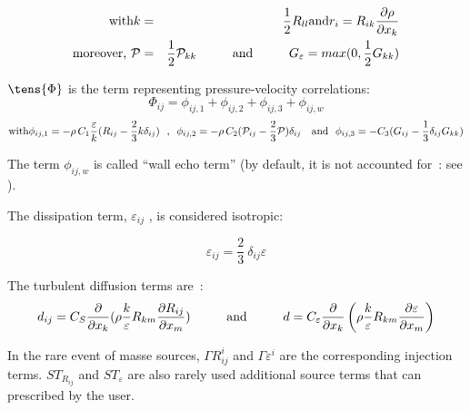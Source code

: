 \begin{eqnarray}
\text{with\hspace*{0cm}}\displaystyle k &=&\frac{1}{2}R_{ll}\text{%
\hspace*{0cm}and\hspace*{0cm}}\displaystyle r_{i}=R_{ik}\frac{\partial \rho
}{\partial x_{k}} \\
\text{moreover,  }\mathcal{P} &=&\frac{1}{2}\mathcal{P}_{kk}\text{%
\hspace*{1cm}and\hspace*{1cm}}G_{\varepsilon }=max(0,\frac{1}{2}G_{kk})
\end{eqnarray}

$\tens{\Phi}$ is the term representing pressure-velocity correlations:
\begin{equation}
\displaystyle\Phi _{ij}=\phi _{ij,1}+\phi _{ij,2}+\phi _{ij,3}+\phi _{ij,w}
\end{equation}%
\begin{equation}
\text{with\hspace*{0cm}}\phi _{ij,1}=-\rho \,C_{1}\frac{\varepsilon }{k}%
(R_{ij}-\frac{2}{3}k\delta _{ij})\text{\ \ , \ }\phi _{ij,2}=-\rho \,C_{2}(%
\mathcal{P}_{ij}-\frac{2}{3}\mathcal{P})\delta _{ij}\text{\ \ \ and\ \ }\phi
_{ij,3}=-C_{3}(G_{ij}-\frac{1}{3}\delta _{ij}G_{kk})
\end{equation}

The term $\phi _{ij,w}$ is called ``wall echo term'' (by default, it is not
accounted for~: see ).

The dissipation term, $\varepsilon _{ij}$ , is considered isotropic:

\begin{equation}
\displaystyle\varepsilon _{ij}=\frac{2}{3}\ \delta _{ij}\varepsilon
\end{equation}

The turbulent diffusion terms are~:
\begin{equation}
d_{ij}=C_{S}\frac{\partial }{\partial x_{k}}(\rho \frac{k}{\varepsilon }%
R_{km}\frac{\partial R_{ij}}{\partial x_{m}})\text{\hspace*{1cm}and%
\hspace*{1cm}}{d}=C_{\varepsilon }\displaystyle\frac{\partial }{\partial
x_{k}}\left( \rho \frac{k}{\varepsilon }R_{km}\frac{\partial \varepsilon }{%
\partial x_{m}}\right)
\end{equation}

In the rare event of masse sources, $\Gamma R_{ij}^{i}$ and $\Gamma
\varepsilon ^{i}$ are the corresponding injection terms. $ST_{R_{ij}}$ and $%
ST_{\varepsilon }$ are also rarely used additional source terms that can
prescribed by the user.

